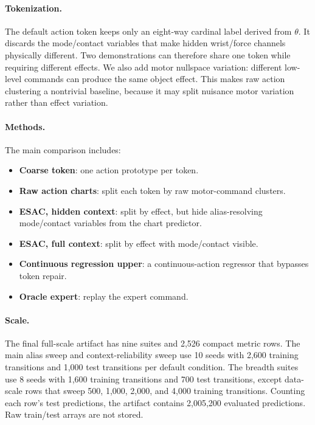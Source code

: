 \documentclass{article}
\begin{document}
\paragraph{Tokenization.}
The default action token keeps only an eight-way cardinal label derived from
$\theta$. It discards the mode/contact variables that make hidden wrist/force
channels physically different. Two demonstrations can therefore share one token
while requiring different effects. We also add motor nullspace variation:
different low-level commands can produce the same object effect. This makes raw
action clustering a nontrivial baseline, because it may split nuisance motor
variation rather than effect variation.

\paragraph{Methods.}
The main comparison includes:
\begin{itemize}[leftmargin=1.4em]
    \item \textbf{Coarse token}: one action prototype per token.
    \item \textbf{Raw action charts}: split each token by raw motor-command
    clusters.
    \item \textbf{ESAC, hidden context}: split by effect, but hide
    alias-resolving mode/contact variables from the chart predictor.
    \item \textbf{ESAC, full context}: split by effect with mode/contact
    visible.
    \item \textbf{Continuous regression upper}: a continuous-action regressor
    that bypasses token repair.
    \item \textbf{Oracle expert}: replay the expert command.
\end{itemize}

\paragraph{Scale.}
The final full-scale artifact has nine suites and 2,526 compact metric rows.
The main alias sweep and context-reliability sweep use 10 seeds with 2,600
training transitions and 1,000 test transitions per default condition. The
breadth suites use 8 seeds with 1,600 training transitions and 700 test
transitions, except data-scale rows that sweep 500, 1,000, 2,000, and 4,000
training transitions. Counting each row's test predictions, the artifact
contains 2,005,200 evaluated predictions. Raw train/test arrays are not stored.
\end{document}
